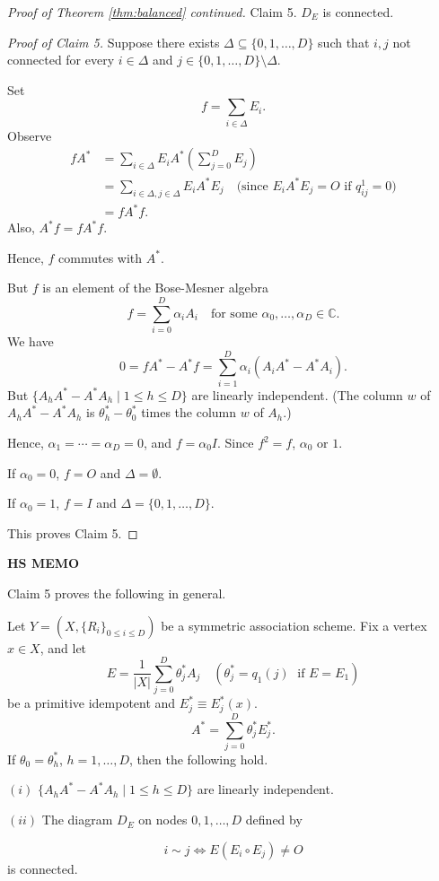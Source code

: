 \documentclass[
]{book}
\theoremstyle{definition}
\theoremstyle{definition}
\theoremstyle{definition}
\theoremstyle{definition}
\theoremstyle{remark}
\begin{document}
\begin{proof}[Proof of Theorem \ref{thm:balanced} continued]
Claim 5. \(D_E\) is connected.

\emph{Proof of Claim 5.}
Suppose there exists \(\Delta \subseteq \{0,1,\ldots, D\}\) such that \(i,j\) not connected for every \(i\in \Delta\) and \(j\in \{0,1,\ldots, D\}\setminus \Delta\).

Set
\[f = \sum_{i\in \Delta}E_i.\]
Observe
\begin{align}
fA^* & = \sum_{i\in \Delta} E_i A^* \left(\sum_{j=0}^D E_j\right)\\
& = \sum_{i\in \Delta, j\in \Delta}E_iA^*E_j \quad \text{(since $E_iA^*E_j=O$ if $q^1_{ij}=0$)}\\
& = fA^*f.
\end{align}
Also, \(A^*f = fA^*f\).

Hence, \(f\) commutes with \(A^*\).

But \(f\) is an element of the Bose-Mesner algebra
\[f = \sum_{i=0}^D \alpha_i A_i \quad \text{for some $\alpha_0, \ldots, \alpha_D\in \mathbb{C}$}.\]
We have
\[0 = fA^*-A^*f = \sum_{i=1}^D \alpha_i(A_iA^*- A^*A_i).\]
But \(\{A_hA^* - A^*A_h \mid 1\leq h\leq D\}\) are linearly independent.
(The column \(w\) of \(A_hA^*-A^*A_h\) is \(\theta^*_h - \theta^*_0\) times the column \(w\) of \(A_h\).)

Hence, \(\alpha_1 = \cdots = \alpha_D = 0\), and \(f = \alpha_0 I\). Since \(f^2 = f\), \(\alpha_0\) or \(1\).

If \(\alpha_0 = 0\), \(f=O\) and \(\Delta = \emptyset\).

If \(\alpha_0 = 1\), \(f=I\) and \(\Delta = \{0, 1, \ldots, D\}\).

This proves Claim 5.

\end{proof}

\textbf{HS MEMO}

Claim 5 proves the following in general.

Let \(Y = (X, \{R_i\}_{0\leq i\leq D})\) be a symmetric association scheme. Fix a vertex \(x\in X\), and let
\[E = \frac{1}{|X|}\sum_{j=0}^D \theta^*_j A_j \quad (\theta^*_j = q_1(j) \; \text{ if $E = E_1$})\]
be a primitive idempotent and \(E^*_j\equiv E^*_j(x)\).
\[A^* = \sum_{j=0}^D \theta_j^*E^*_j.\]
If \(\theta_0 = \theta^*_h\), \(h=1, \ldots, D\), then the following hold.

\((i)\) \(\{A_hA^* - A^*A_h \mid 1\leq h\leq D\}\) are linearly independent.

\((ii)\) The diagram \(D_E\) on nodes \(0, 1, \ldots, D\) defined by

\[i\sim j \Leftrightarrow E(E_i\circ E_j)\neq O\]
is connected.
\end{document}
